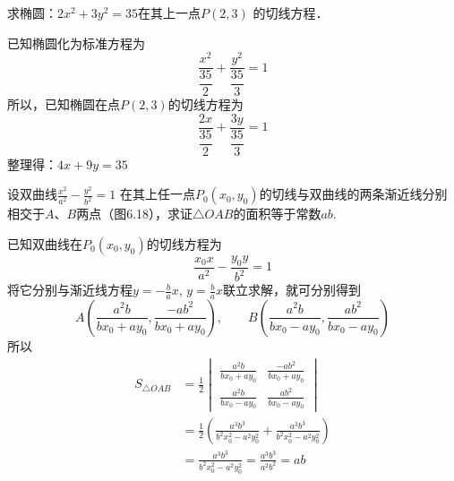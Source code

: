 \begin{example}
    求椭圆：$2x^2+3y^2=35$在其上一点$P(2,3)$
的切线方程．
\end{example}

\begin{solution}
    已知椭圆化为标准方程为
\[\frac{x^2}{\dfrac{35}{2}}+\frac{y^2}{\dfrac{35}{3}}=1\]
所以，已知椭圆在点$P(2,3)$的切线方程为
\[\frac{2x}{\dfrac{35}{2}}+\frac{3y}{\dfrac{35}{3}}=1\]
整理得：$4x+9y=35$
\end{solution}

\begin{example}
    设双曲线$\frac{x^2}{a^2}-\frac{y^2}{b^2}=1$
在其上任一点$P_0(x_0,y_0)$的切线与双曲线的两条渐近线分别相交于$A$、$B$两点（图6.18），求证$\triangle OAB$的面积等于常数$ab$.
\end{example}



\begin{solution}
已知双曲线在$P_0(x_0,y_0)$的切线方程为
\[\frac{x_0x}{a^2}-\frac{y_0y}{b^2}=1\]
将它分别与渐近线方程$y=-\frac{b}{a}x$,
$y=\frac{b}{a}x$联立求解，就可分别得到
\[A\left(\frac{a^2b}{bx_0+ay_0},\frac{-ab^2}{bx_0+ay_0}\right),\qquad B\left(\frac{a^2b}{bx_0-ay_0},\frac{ab^2}{bx_0-ay_0}\right)\]
所以
\[\begin{split}
    S_{\triangle OAB}&=\frac{1}{2}\begin{vmatrix}
        \frac{a^2b}{bx_0+ay_0}& \frac{-ab^2}{bx_0+ay_0}\\
        \frac{a^2b}{bx_0-ay_0}& \frac{ab^2}{bx_0-ay_0}
\end{vmatrix}\\
&=\frac{1}{2}\left(\frac{a^3b^3}{b^2x^2_0-a^2y_0^2}+\frac{a^3b^3}{b^2x^2_0-a^2y_0^2}\right)\\
&=\frac{a^3b^3}{b^2x^2_0-a^2y_0^2}=\frac{a^3b^3}{a^2b^2}=ab
\end{split}\]
\end{solution}

